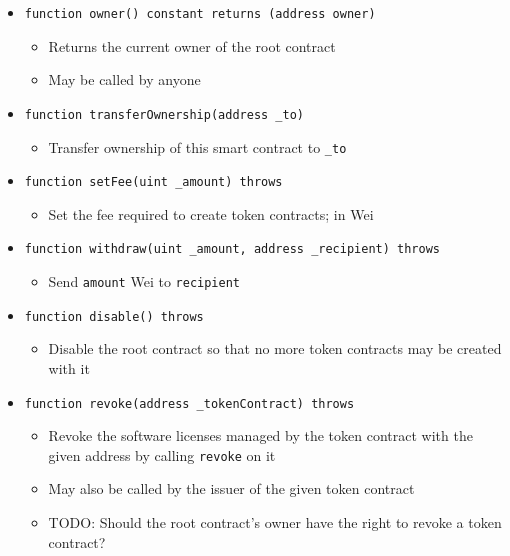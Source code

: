 \documentclass[a4paper]{article}
\newcommand{\todo}[1]{\textsf{TODO: #1}}
\begin{document}
\begin{itemize}
  \item \texttt{function owner() constant returns (address owner)}
  \begin{itemize}
    \item Returns the current owner of the root contract
    \item May be called by anyone
  \end{itemize}

  \item \texttt{function transferOwnership(address \_to)}
  \begin{itemize}
    \item Transfer ownership of this smart contract to \texttt{\_to}
  \end{itemize}

  \item \texttt{function setFee(uint \_amount) throws}
  \begin{itemize}
    \item Set the fee required to create token contracts; in Wei
  \end{itemize}
  
  \item \texttt{function withdraw(uint \_amount, address \_recipient) throws}
  \begin{itemize}
    \item Send \texttt{amount} Wei to \texttt{recipient}
  \end{itemize}
  
  \item \texttt{function disable() throws}
  \begin{itemize}
    \item Disable the root contract so that no more token contracts may be created with it
  \end{itemize}
  
  \item \texttt{function revoke(address \_tokenContract) throws}
  \begin{itemize}
    \item Revoke the software licenses managed by the token contract with the given address by calling \texttt{revoke} on it
    \item May also be called by the issuer of the given token contract
    \item \todo{Should the root contract's owner have the right to revoke a token contract?}
  \end{itemize}
\end{itemize}
\end{document}
